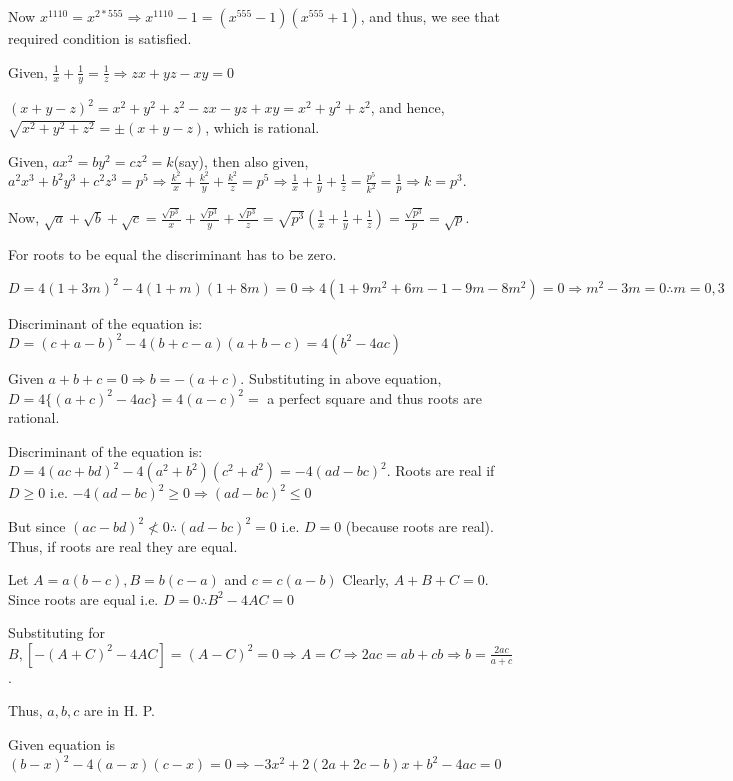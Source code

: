   Now $x^{1110} = x^{2*555}\Rightarrow x^{1110} - 1 = (x^{555} - 1)(x^{555} + 1)$, and thus, we see that
  required condition is satisfied.
\item Given, $\frac{1}{x} + \frac{1}{y} = \frac{1}{z} \Rightarrow zx + yz - xy = 0$

  $(x + y - z)^2 = x^2 + y^2 + z^2 - zx - yz + xy = x^2 + y^2 + z^2$, and hence, $\sqrt{x^2 + y^2 + z^2} =
  \pm(x + y - z)$, which is rational.
\item Given, $ax^2 = by^2 = cz^2 = k$(say), then also given, $a^2x^3 + b^2y^3 + c^2z^3 = p^5 \Rightarrow
  \frac{k^2}{x} + \frac{k^2}{y} + \frac{k^2}{z} = p^5 \Rightarrow \frac{1}{x} + \frac{1}{y} + \frac{1}{z} =
  \frac{p^5}{k^2} = \frac{1}{p} \Rightarrow k = p^3$.

  Now, $\sqrt{a} + \sqrt{b} + \sqrt{c} = \frac{\sqrt{p^3}}{x} + \frac{\sqrt{p^3}}{y} + \frac{\sqrt{p^3}}{z}
  = \sqrt{p^3}\left(\frac{1}{x} + \frac{1}{y} + \frac{1}{z}\right) = \frac{\sqrt{p^3}}{p} = \sqrt{p}$.
\item For roots to be equal the discriminant has to be zero.

   $D = 4(1 + 3m)^2 - 4(1 + m)(1 + 8m) = 0\Rightarrow 4(1 + 9m^2 + 6m - 1 - 9m -8m^2) = 0\Rightarrow m^2 -
  3m = 0 \therefore m = 0, 3$
\item Discriminant of the equation is: $D = (c + a - b)^2 - 4(b + c - a)(a + b -c) = 4(b^2 - 4ac)$

  Given $a + b + c = 0 \Rightarrow b = -(a + c).$ Substituting in above equation, $D = 4\{(a + c)^2 - 4ac\}
  = 4(a - c)^2 =$ a perfect square and thus roots are rational.
\item Discriminant of the equation is: $D = 4(ac + bd)^2 - 4(a^2 + b^2)(c^2 + d^2) = -4(ad - bc)^2$. Roots
  are real if $D\geq 0$ i.e. $-4(ad - bc)^2 \geq 0 \Rightarrow (ad - bc)^2 \leq 0$

  But since $(ac - bd)^2 \nless 0 \therefore (ad - bc)^2 = 0$ i.e. $D = 0$ (because roots are real). Thus,
  if roots are real they are equal.
\item Let $A = a(b - c), B = b(c - a)$ and $c = c(a - b)$ Clearly, $A + B + C = 0$. Since roots are equal
  i.e. $D = 0 \therefore B^2 - 4AC = 0$

  Substituting for $B, [-(A + C)^2 - 4AC] = (A - C)^2 = 0 \Rightarrow A = C \Rightarrow 2ac = ab + cb
  \Rightarrow b = \frac{2ac}{a + c}$.

  Thus, $a, b, c$ are in H. P.
\item Given equation is $(b - x)^2 - 4(a - x)(c - x) = 0\Rightarrow -3x^2 + 2(2a + 2c - b)x + b^2 - 4ac = 0$

